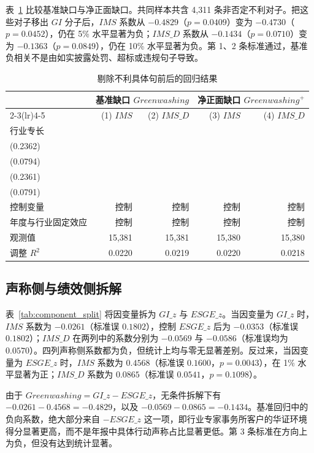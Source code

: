 \documentclass[12pt,a4paper]{article}
\begin{document}
表~\ref{tab:gi_plus} 比较基准缺口与净正面缺口。共同样本共含 4,311 条非否定不利对子。把这些对子移出 $GI$ 分子后，$IMS$ 系数从 $-0.4829$（$p=0.0409$）变为 $-0.4730$（$p=0.0452$），仍在 5\% 水平显著为负；$IMS\_D$ 系数从 $-0.1434$（$p=0.0710$）变为 $-0.1363$（$p=0.0849$），仍在 10\% 水平显著为负。第 1、2 条标准通过，基准负相关不是由如实披露处罚、超标或违规句子导致。

\begin{table}[htbp]
\centering
\caption{剔除不利具体句前后的回归结果}
\label{tab:gi_plus}
\renewcommand{\arraystretch}{1.25}
\begin{tabular}{lrrrr}
\toprule
 & \multicolumn{2}{c}{基准缺口 $Greenwashing$} & \multicolumn{2}{c}{净正面缺口 $Greenwashing^+$} \\
\cmidrule(lr){2-3}\cmidrule(lr){4-5}
 & (1) $IMS$ & (2) $IMS\_D$ & (3) $IMS$ & (4) $IMS\_D$ \\
\midrule
行业专长 & \shortstack{$-0.4829^{**}$\\(0.2362)} & \shortstack{$-0.1434^{*}$\\(0.0794)} & \shortstack{$-0.4730^{**}$\\(0.2361)} & \shortstack{$-0.1363^{*}$\\(0.0791)} \\
控制变量 & 控制 & 控制 & 控制 & 控制 \\
年度与行业固定效应 & 控制 & 控制 & 控制 & 控制 \\
观测值 & 15,381 & 15,381 & 15,380 & 15,380 \\
调整 $R^2$ & 0.0220 & 0.0219 & 0.0220 & 0.0218 \\
\bottomrule
\end{tabular}
\end{table}

\subsection{声称侧与绩效侧拆解}

表~\ref{tab:component_split} 将因变量拆为 $GI\_z$ 与 $ESGE\_z$。当因变量为 $GI\_z$ 时，$IMS$ 系数为 $-0.0261$（标准误 $0.1802$），控制 $ESGE\_z$ 后为 $-0.0353$（标准误 $0.1802$）；$IMS\_D$ 在两列中的系数分别为 $-0.0569$ 与 $-0.0586$（标准误均为 $0.0570$）。四列声称侧系数都为负，但统计上均与零无显著差别。反过来，当因变量为 $ESGE\_z$ 时，$IMS$ 系数为 $0.4568$（标准误 $0.1600$，$p=0.0043$），在 1\% 水平显著为正；$IMS\_D$ 系数为 $0.0865$（标准误 $0.0541$，$p=0.1098$）。

由于 $Greenwashing=GI\_z-ESGE\_z$，无条件拆解下有 $-0.0261-0.4568=-0.4829$，以及 $-0.0569-0.0865=-0.1434$。基准回归中的负向系数，绝大部分来自 $-ESGE\_z$ 这一项，即行业专家事务所客户的华证环境得分显著更高，而不是年报中具体行动声称占比显著更低。第 3 条标准在方向上为负，但没有达到统计显著。
\end{document}
